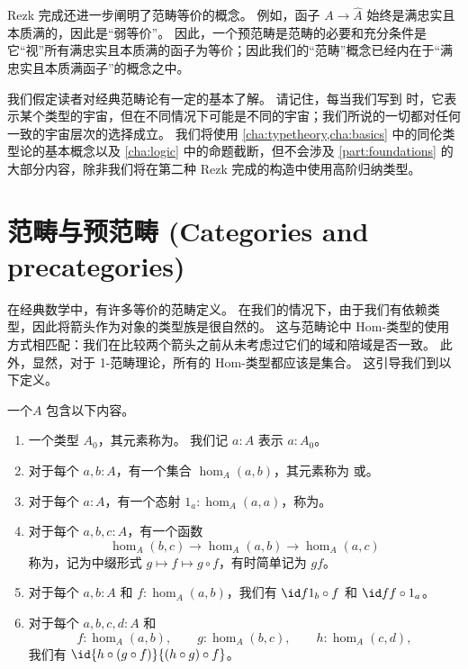 Rezk 完成还进一步阐明了范畴等价的概念。
例如，函子 $A \to \widehat{A}$ 始终是满忠实且本质满的，因此是“弱等价”。
因此，一个预范畴是范畴的必要和充分条件是它“视”所有满忠实且本质满的函子为等价；因此我们的“范畴”概念已经内在于“满忠实且本质满函子”的概念之中。

我们假定读者对经典范畴论有一定的基本了解。 
请记住，每当我们写到 \type 时，它表示某个类型的宇宙，但在不同情况下可能是不同的宇宙；我们所说的一切都对任何一致的宇宙层次的选择成立。
我们将使用 \cref{cha:typetheory,cha:basics} 中的同伦类型论的基本概念以及 \cref{cha:logic} 中的命题截断，但不会涉及 \cref{part:foundations} 的大部分内容，除非我们将在第二种 Rezk 完成的构造中使用高阶归纳类型。

\section{范畴与预范畴 (Categories and precategories)}
\label{sec:cats}

在经典数学中，有许多等价的范畴定义。
在我们的情况下，由于我们有依赖类型，因此将箭头作为对象的类型族是很自然的。
这与范畴论中 Hom-类型的使用方式相匹配：我们在比较两个箭头之前从未考虑过它们的域和陪域是否一致。
此外，显然，对于 1-范畴理论，所有的 Hom-类型都应该是集合。
这引导我们到以下定义。

\begin{defn}\label{ct:precategory}
一个$A$ 包含以下内容。
\begin{enumerate}
  \item 一个类型 $A_0$，其元素称为。%
  我们记 $a:A$ 表示 $a:A_0$。
  \item 对于每个 $a,b:A$，有一个集合 $\hom_A(a,b)$，其元素称为 或。%
  \item 对于每个 $a:A$，有一个态射 $1_a:\hom_A(a,a)$，称为。%
  \item 对于每个 $a,b,c:A$，有一个函数%
  \[  \hom_A(b,c) \to \hom_A(a,b) \to \hom_A(a,c) \]
  称为，记为中缀形式 $g\mapsto f\mapsto g\circ f$，有时简单记为 $gf$。
  \item 对于每个 $a,b:A$ 和 $f:\hom_A(a,b)$，我们有 $\id f {1_b\circ f}$ 和 $\id f {f\circ 1_a}$。
  \item 对于每个 $a,b,c,d:A$ 和
  \begin{equation*}
    f:\hom_A(a,b), \qquad
    g:\hom_A(b,c), \qquad
    h:\hom_A(c,d),
  \end{equation*}
  我们有 $\id {h\circ (g\circ f)}{(h\circ g)\circ f}$。
\end{enumerate}
\end{defn}

